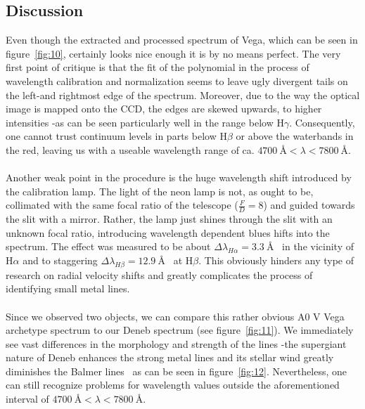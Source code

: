 \documentclass{article}
\begin{document}
\subsection{Discussion}
\label{ss:4}
Even though the extracted and processed spectrum of Vega, which can be seen in figure~\ref{fig:10}, certainly looks nice enough it is by no means perfect. The very first point of critique is that the fit of the polynomial in the process of wavelength calibration and normalization seems to leave ugly divergent tails on the left{-}and rightmost edge of the spectrum. Moreover, due to the way the optical image is mapped onto the CCD, the edges are skewed upwards, to higher intensities {-}as can be seen particularly well in the range below H$\gamma$.  Consequently, one cannot trust continuum levels in parts below H$\beta$ or above the waterbands in the red, leaving us with a useable wavelength range of ca. $\SI{4700}{\angstrom} < \lambda < \SI{7800}{\angstrom}$.\\\\Another weak point in the procedure is the huge wavelength shift introduced by the calibration lamp. The light of the neon lamp is not, as ought to be, collimated with the same focal ratio of the telescope ($\frac{F}{D}=8$) and guided towards the slit with a mirror. Rather, the lamp just shines through the slit with an unknown focal ratio, introducing wavelength dependent blues hifts into the spectrum. The effect was measured to be about $\Delta\lambda_{H\alpha} = \SI{3.3}{\angstrom}$ ~in the vicinity of H$\alpha$ and to staggering $\Delta\lambda_{H\beta} = \SI{12.9}{\angstrom}$ ~at H$\beta$. This obviously hinders any type of research on radial velocity shifts and greatly complicates the process of identifying small metal lines.\\\\
Since we observed two objects, we can compare this rather obvious A0 V Vega archetype spectrum to our Deneb spectrum (see figure~\ref{fig:11}). We immediately see vast differences in the morphology and strength of the lines {-}the supergiant nature of Deneb enhances the strong metal lines and its stellar wind greatly diminishes the Balmer lines~\parencite{Line_Variability} as can be seen in figure~\ref{fig:12}. Nevertheless, one can still recognize problems for wavelength values outside the aforementioned interval of $\SI{4700}{\angstrom} < \lambda < \SI{7800}{\angstrom}$.
\end{document}
